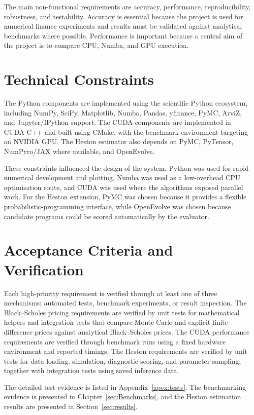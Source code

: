 \documentclass[11pt]{report}
\begin{document}
The main non-functional requirements are accuracy, 
performance, reproducibility, robustness, and testability. 
Accuracy is essential because the project is used for numerical finance experiments 
and results must be validated against analytical benchmarks where possible.
Performance is important because a central aim of the project is to 
compare CPU, Numba, and GPU execution.


\section{Technical Constraints}
The Python components are implemented using the scientific Python ecosystem,
including NumPy, SciPy, Matplotlib, Numba, Pandas, yfinance, PyMC,
ArviZ, and Jupyter/IPython support. The CUDA components are implemented in
CUDA C++ and built using CMake, with the benchmark environment targeting an
NVIDIA GPU. The Heston estimator also depends on PyMC, PyTensor, NumPyro/JAX
where available, and OpenEvolve.

These constraints influenced the design of the system. Python was used for
rapid numerical development and plotting, Numba was used as a low-overhead
CPU optimisation route, and CUDA was used where the algorithms exposed
parallel work. For the Heston extension, PyMC was chosen because it provides
a flexible probabilistic-programming interface, while OpenEvolve was chosen
because candidate programs could be scored automatically by the evaluator.

\section{Acceptance Criteria and Verification}
Each high-priority requirement is verified through at least one of three
mechanisms: automated tests, benchmark experiments, or result
inspection. The Black--Scholes pricing requirements are verified by unit
tests for mathematical helpers and integration tests that compare Monte
Carlo and explicit finite-difference prices against analytical
Black--Scholes prices. The CUDA performance requirements are verified
through benchmark runs using a fixed hardware environment and reported
timings. The Heston requirements are verified by unit tests for data loading,
simulation, diagnostic scoring, and parameter sampling, together with
integration tests using saved inference data.

The detailed test evidence is listed in Appendix~\ref{apex:tests}. The
benchmarking evidence is presented in Chapter~\ref{sec:Benchmarks}, and the
Heston estimation results are presented in Section~\ref{sec:results}.
\end{document}
